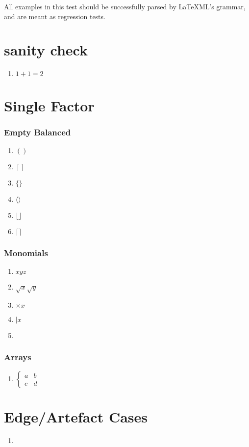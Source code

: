 \documentclass{article}
\begin{document}
All examples in this test should be successfully parsed by LaTeXML's grammar, and are meant as regression tests.

\section{sanity check}
\begin{enumerate}
\item $1+1=2$
\end{enumerate}

\section{Single Factor}
\subsubsection{Empty Balanced}
\begin{enumerate}
  \item $()$
  \item $[]$
  \item $\{\}$
  \item $\langle\rangle$
  \item $\lfloor\rfloor$
  \item $\lceil\rceil$
\end{enumerate}

\subsubsection{Monomials}
\begin{enumerate}
  \item $xyz$
  \item $\sqrt{x}\sqrt{y}$
  \item $\times x$ %
  \item $\mathbin{|} x$ %
  \item 
\end{enumerate}

\subsubsection{Arrays}
\begin{enumerate}
  \item $\begin{cases} 
    a & b \\
    c & d 
    \end{cases}$

\end{enumerate}

\section{Edge/Artefact Cases}
\begin{enumerate}
  \item $\,$  %
\end{enumerate}
\end{document}
